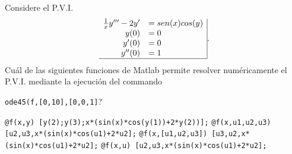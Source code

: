 \begin{pregunta}
\begin{cuerpo}
Considere el P.V.I.
$$
\begin{array}{rl|}
\frac{1}{x}y'''-2y'	&=sen(x)cos(y)\\
y(0)	&=0\\
y'(0)	&=0\\
y''(0)	&=1\\ \hline
\end{array}.
$$
\textquestiondown Cu\'al de las siguientes funciones de Matlab permite resolver num\'ericamente el P.V.I. mediante la ejecuci\'on del commando 
\begin{center}
\texttt{ode45(f,[0,10],[0,0,1]}\hspace{3mm}?
\end{center}
\end{cuerpo}
\begin{alternativas}
{\texttt{@f(x,y) [y(2);y(3);x*(sin(x)*cos(y(1))+2*y(2))];}}
{\texttt{@f(x,u1,u2,u3) [u2,u3,x*(sin(x)*cos(u1)+2*u2];}}
{\texttt{@f(x,[u1,u2,u3]) [u3,u2,x*(sin(x)*cos(u1)+2*u2];}}
{\texttt{@f(x,u) [u2,u3,x*(sin(x)*cos(u1)+2*u2];}}
\end{alternativas}
\justificacion{0cm}
\end{pregunta}